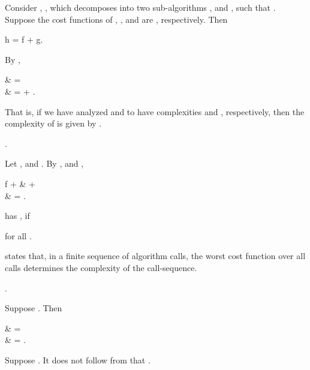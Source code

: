 \documentclass[b5paper, english, oneside]{memoir}
\begin{document}
\begin{example}
Consider , , which decomposes into two sub-algorithms , and , such that . Suppose the cost functions of , , and  are , respectively. Then 
\begin{eqs}
h = f + g.
\end{eqs}
By ,
\begin{eqs}
 & =  \\
{} & =  + .
\end{eqs}
That is, if we have analyzed  and  to have complexities  and , respectively, then the complexity of  is given by .
\end{example}

\begin{example}
.
\end{example}

\begin{example}
Let , and . By , and , 
\begin{eqs}
f +  & \subset {} +  \\
{} & = .
\end{eqs}
\end{example}

\begin{definition}
 has , if

for all .
\end{definition}

\begin{note}
 states that, in a finite sequence of algorithm calls, the worst cost function over all calls determines the complexity of the call-sequence.
\end{note}

\begin{example}
.
\end{example}

\begin{example}
Suppose . Then
\begin{eqs}
 & =  \\
{} & = .
\end{eqs}
\end{example}

\begin{example}
Suppose . It does not follow from  that .
\end{example}
\end{document}
